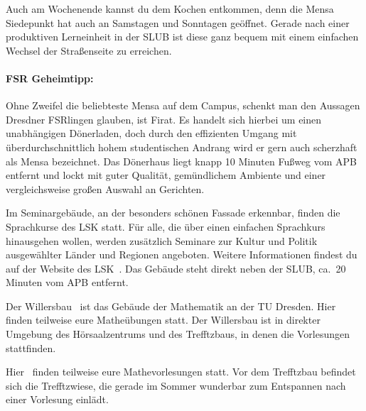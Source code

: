 Auch am Wochenende kannst du dem Kochen entkommen, denn die Mensa Siedepunkt hat auch an Samstagen und Sonntagen geöffnet.
Gerade nach einer produktiven Lerneinheit in der SLUB ist diese ganz bequem mit einem einfachen Wechsel der Straßenseite zu erreichen.

\paragraph{FSR Geheimtipp:}
Ohne Zweifel die beliebteste Mensa auf dem Campus, schenkt man den Aussagen Dresdner FSRlingen glauben, ist Firat.
Es handelt sich hierbei um einen unabhängigen Dönerladen, doch durch den effizienten Umgang mit überdurchschnittlich hohem studentischen Andrang wird er gern auch scherzhaft als Mensa bezeichnet.
Das Dönerhaus liegt knapp 10 Minuten Fußweg vom APB entfernt und lockt mit guter Qualität, gemündlichem Ambiente und einer vergleichsweise großen Auswahl an Gerichten.

Im Seminargebäude, an der besonders schönen Fassade erkennbar, finden die Sprachkurse des LSK statt.
Für alle, die über einen einfachen Sprachkurs hinausgehen wollen, werden zusätzlich Seminare zur Kultur und Politik ausgewählter Länder und Regionen angeboten.
Weitere Informationen findest du auf der Website des LSK~.
Das Gebäude steht direkt neben der SLUB, ca.\ 20 Minuten vom APB entfernt.

Der Willersbau~ ist das Gebäude der Mathematik an der TU Dresden. Hier finden teilweise eure Matheübungen statt. Der Willersbau ist in direkter Umgebung
des Hörsaalzentrums und des Trefftzbaus, in denen die Vorlesungen stattfinden. 

Hier~ finden teilweise eure Mathevorlesungen statt. Vor dem Trefftzbau befindet sich die Trefftzwiese, die gerade im Sommer wunderbar zum Entspannen nach
einer Vorlesung einlädt. 


